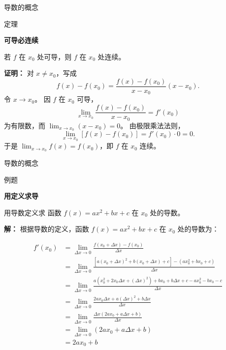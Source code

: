 \documentclass[aspectratio=169,10pt,fontset=fandol]{ctexbeamer}
\begin{document}
\begin{frame}[t,fragile]{导数的概念}
\normalsize
\begin{block}{定理}
{\normalsize
\textbf{可导必连续}\par

若 $f$ 在 $x_0$ 处可导，则 $f$ 在 $x_0$ 处连续。

}
\end{block}
\pause
{\normalsize
\textbf{证明：}
对 $x\neq x_0$，写成
\[
f(x)-f(x_0)=\frac{f(x)-f(x_0)}{x-x_0}(x-x_0).
\]
令 $x\to x_0$。 因 $f$ 在 $x_0$ 可导，
\[
\lim_{x\to x_0}\frac{f(x)-f(x_0)}{x-x_0}=f'(x_0)
\]
为有限数，而 $\lim_{x\to x_0}(x-x_0)=0$。 由极限乘法法则，
\[
\lim_{x\to x_0}[f(x)-f(x_0)]=f'(x_0)\cdot0=0.
\]
于是 $\lim_{x\to x_0}f(x)=f(x_0)$，即 $f$ 在 $x_0$ 连续。

}
\end{frame}
\begin{frame}[t,fragile]{导数的概念}
\footnotesize
\begin{block}{例题}
{\footnotesize
\textbf{用定义求导}\par

用导数定义求 函数 $f(x) = ax^2 + bx + c$ 在 $x_0$ 处的导数。

}
\end{block}
\pause
{\footnotesize
\textbf{解：}
根据导数的定义，函数 $f(x) = ax^2 + bx + c$ 在 $x_0$ 处的导数为：

\begin{align*}
	f'(x_0) &= \lim_{\Delta x \to 0} \frac{f(x_0 + \Delta x) - f(x_0)}{\Delta x} \\
	&= \lim_{\Delta x \to 0} \frac{[a(x_0 + \Delta x)^2 + b(x_0 + \Delta x) + c] - (ax_0^2 + bx_0 + c)}{\Delta x} \\
	&= \lim_{\Delta x \to 0} \frac{a(x_0^2 + 2x_0\Delta x + (\Delta x)^2) + bx_0 + b\Delta x + c - ax_0^2 - bx_0 - c}{\Delta x} \\
	&= \lim_{\Delta x \to 0} \frac{2ax_0\Delta x + a(\Delta x)^2 + b\Delta x}{\Delta x} \\
	&= \lim_{\Delta x \to 0} \frac{\Delta x(2ax_0 + a\Delta x + b)}{\Delta x} \\
	&= \lim_{\Delta x \to 0} (2ax_0 + a\Delta x + b) \\
	&= 2ax_0 + b
\end{align*}

}
\end{frame}
\end{document}
